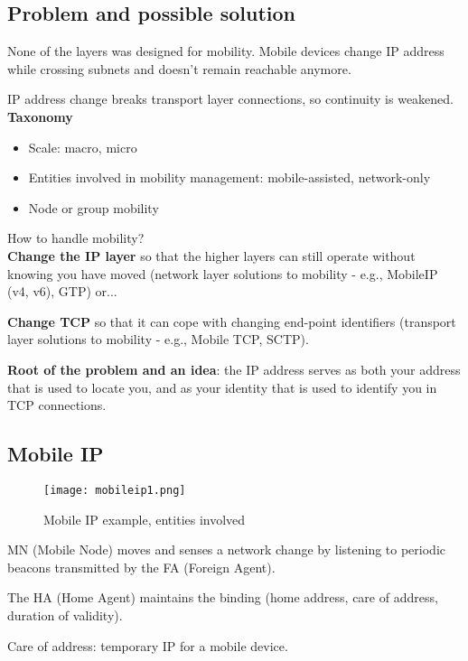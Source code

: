 \subsection{Problem and possible solution}

None of the layers was designed for mobility.
Mobile devices change IP address while crossing subnets and doesn't remain
reachable anymore.

IP address change breaks transport layer connections, so continuity is
weakened.\\

\textbf{Taxonomy}

\begin{itemize}
\item Scale: macro, micro
\item Entities involved in mobility management: mobile-assisted, network-only
\item Node or group mobility
\end{itemize}

How to handle mobility?\\

\textbf{Change the IP layer} so that the higher layers can still operate without
knowing you have moved (network layer solutions to mobility - e.g.,
MobileIP (v4, v6), GTP) or...

\textbf{Change TCP} so that it can cope with changing end-point identifiers
(transport layer solutions to mobility - e.g., Mobile TCP, SCTP).

\textbf{Root of the problem and an idea}: the IP address serves as both your
address that is used to locate you, and as your identity that is used to
identify you in TCP connections.

\subsection{Mobile IP}

\begin{figure}[H]
  \centering
  \texttt{[image: mobileip1.png]}
  \caption{Mobile IP example, entities involved}
  \label{fig:mobileip1}
\end{figure}

MN (Mobile Node) moves and senses a network change by listening to periodic
beacons transmitted by the FA (Foreign Agent).

The HA (Home Agent) maintains the binding (home address, care of address,
duration of validity).

Care of address: temporary IP for a mobile device.

